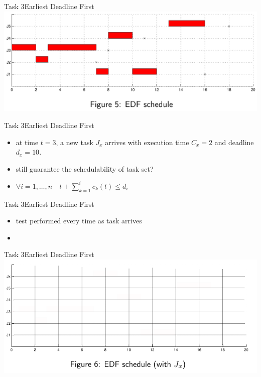 \begin{frame}{Task 3}{Earliest Deadline First}
  \includegraphics[width=\textwidth]{./figures/3_sol.png}
\end{frame}

\begin{frame}{Task 3}{Earliest Deadline First}
  \begin{task}
    \begin{itemize}
      \item at time $t = 3$, a new task $J_x$ arrives with execution time $C_x = 2$ and deadline $d_x = 10$.
      \item still \alert{guarantee the schedulability} of task set?
    \end{itemize}
  \end{task}
  \begin{requirements}
    \begin{itemize}
      \item $\forall i=1, \ldots, n \quad t+\sum_{k=1}^i c_k(t) \leq d_i$
    \end{itemize}
  \end{requirements}
\end{frame}

\begin{frame}{Task 3}{Earliest Deadline First}
  \begin{solution}
    \begin{itemize}
      \item test performed every time as \alert{task arrives}
      \item
    \end{itemize}
  \end{solution}
\end{frame}

\begin{frame}{Task 3}{Earliest Deadline First}
  \includegraphics[width=\textwidth]{./figures/3_empty_2.png}
\end{frame}

